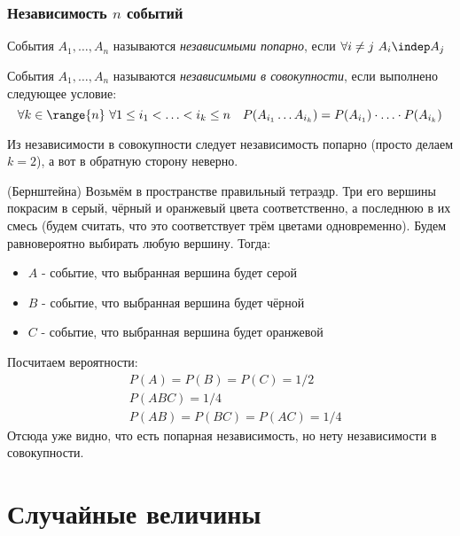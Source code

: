 \subsubsection*{Независимость $n$ событий}

\begin{definition}
	События $A_1, \ldots, A_n$ называются \textit{независимыми попарно}, если $\forall i \neq j\ A_i \indep A_j$
\end{definition}

\begin{definition}
	События $A_1, \ldots, A_n$ называются \textit{независимыми в совокупности}, если выполнено следующее условие:
	\[
		\forall k \in \range{n}\ \forall 1 \le i_1 < \ldots < i_k \le n \quad P(A_{i_1} \ldots A_{i_k}) = P(A_{i_1}) \cdot \ldots \cdot P(A_{i_k})
	\]
\end{definition}

\begin{note}
	Из независимости в совокупности следует независимость попарно (просто делаем $k = 2$), а вот в обратную сторону неверно.
\end{note}

\begin{example} (Бернштейна)
	Возьмём в пространстве правильный тетраэдр. Три его вершины покрасим в серый, чёрный и оранжевый цвета соответственно, а последнюю в их смесь (будем считать, что это соответствует трём цветами одновременно). Будем равновероятно выбирать любую вершину. Тогда:
	\begin{itemize}
		\item $A$ - событие, что выбранная вершина будет серой
		
		\item $B$ - событие, что выбранная вершина будет чёрной
		
		\item $C$ - событие, что выбранная вершина будет оранжевой
	\end{itemize}
	Посчитаем вероятности:
	\begin{align*}
		&{P(A) = P(B) = P(C) = 1 / 2}
		\\
		&{P(ABC) = 1 / 4}
		\\
		&{P(AB) = P(BC) = P(AC) = 1 / 4}
	\end{align*}
	Отсюда уже видно, что есть попарная независимость, но нету независимости в совокупности.
\end{example}

\section{Случайные величины}

